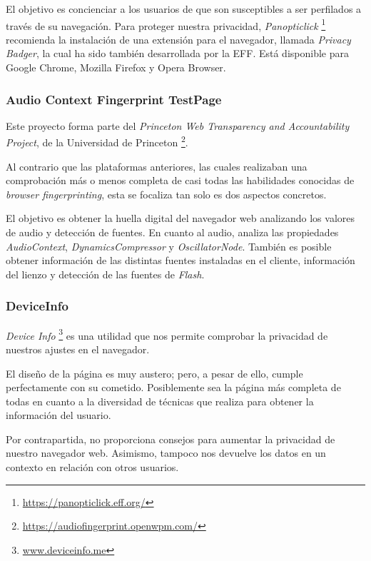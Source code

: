 El objetivo es concienciar a los usuarios de que son susceptibles a ser perfilados a través de su navegación. Para proteger nuestra privacidad, \textit{Panopticlick} \footnote{\url{https://panopticlick.eff.org/}} recomienda la instalación de una extensión para el navegador, llamada \textit{Privacy Badger}, la cual ha sido también desarrollada por la EFF. Está disponible para Google Chrome, Mozilla Firefox y Opera Browser. \par 

\subsubsection{Audio Context Fingerprint TestPage}

Este proyecto forma parte del \textit{Princeton Web Transparency and Accountability Project}, de la Universidad de Princeton \footnote{\url{https://audiofingerprint.openwpm.com/}}. \par 

Al contrario que las plataformas anteriores, las cuales realizaban una comprobación más o menos completa de casi todas las habilidades conocidas de \textit{browser fingerprinting}, esta se focaliza tan solo es dos aspectos concretos. \par

El objetivo es obtener la huella digital del navegador web analizando los valores de audio y detección de fuentes. En cuanto al audio, analiza las propiedades \textit{AudioContext}, \textit{DynamicsCompressor} y \textit{OscillatorNode}. También es posible obtener información de las distintas fuentes instaladas en el cliente, información del lienzo y detección de las fuentes de \textit{Flash}. \par 

\subsubsection{DeviceInfo}

\textit{Device Info} \footnote{\url{www.deviceinfo.me}} es una utilidad que nos permite comprobar la privacidad de nuestros ajustes en el navegador. \par

El diseño de la página es muy austero; pero, a pesar de ello, cumple perfectamente con su cometido. Posiblemente sea la página más completa de todas en cuanto a la diversidad de técnicas que realiza para obtener la información del usuario. \par

Por contrapartida, no proporciona consejos para aumentar la privacidad de nuestro navegador web. Asimismo, tampoco nos devuelve los datos en un contexto en relación con otros usuarios. \par

